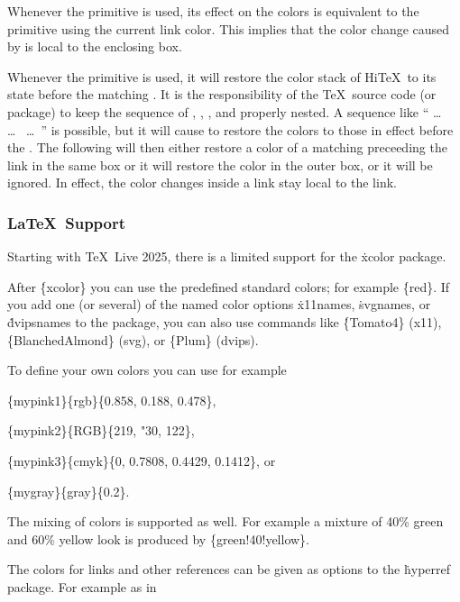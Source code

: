 Whenever the  primitive is used, its effect on the
colors is equivalent to the  primitive using the current
link color. This implies that the color change caused by 
is local to the enclosing box.

Whenever the  primitive is used, it will restore
the color stack of Hi\TeX\ to its state before the matching .
It is the responsibility of the \TeX\ source code (or package) to keep the
sequence of  , ,
, and  properly nested.
A sequence like  `` \dots\ 
 \dots\  \dots\ '' is possible,
but it will cause  to restore the colors to those
in effect before the .
The following  will then either restore
a color of a matching  preceeding
the link in the same box or it will restore the
color in the outer box, or it will be ignored.
In effect, the color changes inside a link stay local to the link.

\subsubsection{\LaTeX\ Support}
Starting with \TeX\ Live 2025, there is a limited support for the \.{xcolor}
package.

After \.{\{xcolor\}} you can use the predefined standard colors;
for example \.{\{red\}}.
If you add one (or several) of the named color
options \.{x11names}, \.{svgnames}, or \.{dvipsnames} to the package,
you can also use commands like
\.{\{Tomato4\}} (x11),
\.{\{BlanchedAlmond\}} (svg), or
\.{\{Plum\}} (dvips).


To define your own colors you can use for example

\.{\{mypink1\}\{rgb\}\{0.858, 0.188, 0.478\}},

\.{\{mypink2\}\{RGB\}\{219, "30, 122\}},

\.{\{mypink3\}\{cmyk\}\{0, 0.7808, 0.4429, 0.1412\}}, or

\.{\{mygray\}\{gray\}\{0.2\}}.

The mixing of colors is supported as well. For example a
mixture of 40\% green and 60\% yellow look is produced by
\.{\{green!40!yellow\}}.

The colors for links and other references can be given as options
to the \.{hyperref} package. For example as in

